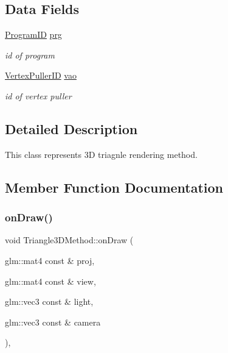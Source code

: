 \subsection*{Data Fields}
\begin{DoxyCompactItemize}
\item 
\mbox{\label{classTriangle3DMethod_a07fddb9a07f2851dd346dc7b449e75c1}} 
\hyperlink{fwd_8hpp_a46ffd067c21ab50f5f1fcfed5d8bfc15}{Program\+ID} \hyperlink{classTriangle3DMethod_a07fddb9a07f2851dd346dc7b449e75c1}{prg}
\begin{DoxyCompactList}\small\item\em id of program \end{DoxyCompactList}\item 
\mbox{\label{classTriangle3DMethod_ab19d501248c66ebf94b51cf4c2a4aa3c}} 
\hyperlink{fwd_8hpp_af6f78f73099477c9ce5537d657597486}{Vertex\+Puller\+ID} \hyperlink{classTriangle3DMethod_ab19d501248c66ebf94b51cf4c2a4aa3c}{vao}
\begin{DoxyCompactList}\small\item\em id of vertex puller \end{DoxyCompactList}\end{DoxyCompactItemize}


\subsection{Detailed Description}
This class represents 3D triagnle rendering method. 

\subsection{Member Function Documentation}
\mbox{\label{classTriangle3DMethod_a8e006abc4a38f47bfda0263acfbb7585}} 
\subsubsection{\texorpdfstring{on\+Draw()}{onDraw()}}
{\footnotesize\ttfamily void Triangle3\+D\+Method\+::on\+Draw (\begin{DoxyParamCaption}\item[{glm\+::mat4 const \&}]{proj,  }\item[{glm\+::mat4 const \&}]{view,  }\item[{glm\+::vec3 const \&}]{light,  }\item[{glm\+::vec3 const \&}]{camera }\end{DoxyParamCaption})\hspace{0.3cm}{\ttfamily [override]}, {\ttfamily [virtual]}}



